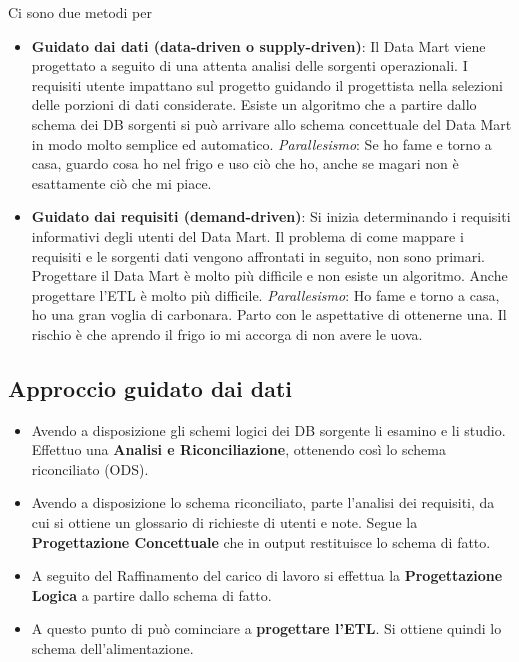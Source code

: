 Ci sono due metodi per 
\begin{itemize}
	\item \textbf{Guidato dai dati (data-driven o supply-driven)}: Il Data Mart viene progettato a seguito di una attenta analisi delle sorgenti operazionali. I requisiti utente impattano sul progetto guidando il progettista nella selezioni delle porzioni di dati considerate.\newline
	Esiste un algoritmo che a partire dallo schema dei DB sorgenti si può arrivare allo schema concettuale del Data Mart in modo molto semplice ed automatico.
	\textit{Parallesismo}: Se ho fame e torno a casa, guardo cosa ho nel frigo e uso ciò che ho, anche se magari non è esattamente ciò che mi piace.
	\item \textbf{Guidato dai requisiti (demand-driven)}: Si inizia determinando i requisiti informativi degli utenti del Data Mart. Il problema di come mappare i requisiti e le sorgenti dati vengono affrontati in seguito, non sono primari.\newline
	Progettare il Data Mart è molto più difficile e non esiste un algoritmo. Anche progettare l'ETL è molto più difficile.\newline
	\textit{Parallesismo}: Ho fame e torno a casa, ho una gran voglia di carbonara. Parto con le aspettative di ottenerne una. Il rischio è che aprendo il frigo io mi accorga di non avere le uova.
\end{itemize}

\subsection{Approccio guidato dai dati}
\begin{itemize}
	\item Avendo a disposizione gli schemi logici dei DB sorgente li esamino e li studio. Effettuo una \textbf{Analisi e Riconciliazione}, ottenendo così lo schema riconciliato (ODS).
	\item Avendo a disposizione lo schema riconciliato, parte l'analisi dei requisiti, da cui si ottiene un glossario di richieste di utenti e note. Segue la \textbf{Progettazione Concettuale} che in output restituisce lo schema di fatto.
	\item A seguito del Raffinamento del carico di lavoro si effettua la \textbf{Progettazione Logica} a partire dallo schema di fatto.
	\item A questo punto di può cominciare a \textbf{progettare l'ETL}. Si ottiene quindi lo schema dell'alimentazione.
\end{itemize}

